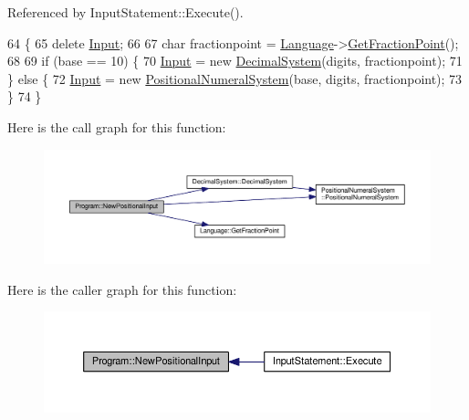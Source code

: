Referenced by Input\+Statement\+::\+Execute().


\begin{DoxyCode}
64 \{
65     \textcolor{keyword}{delete} \hyperlink{classProgram_a6327f15962926e4f74f15e8ff56e04e5}{Input};
66 
67     \textcolor{keywordtype}{char} fractionpoint = \hyperlink{classLanguage}{Language}->\hyperlink{classLanguage_a4c214f08d47e84d53f37bcb5b1fe1b65}{GetFractionPoint}();
68 
69     \textcolor{keywordflow}{if} (base == 10) \{
70         \hyperlink{classProgram_a6327f15962926e4f74f15e8ff56e04e5}{Input} = \textcolor{keyword}{new} \hyperlink{classDecimalSystem}{DecimalSystem}(digits, fractionpoint);
71     \} \textcolor{keywordflow}{else} \{
72         \hyperlink{classProgram_a6327f15962926e4f74f15e8ff56e04e5}{Input} = \textcolor{keyword}{new} \hyperlink{classPositionalNumeralSystem}{PositionalNumeralSystem}(base, digits, fractionpoint);
73     \}
74 \}
\end{DoxyCode}


Here is the call graph for this function\+:\nopagebreak
\begin{figure}[H]
\begin{center}
\leavevmode
\includegraphics[width=350pt]{classProgram_aef8e1c957776e550081cb2c47a11d64b_cgraph}
\end{center}
\end{figure}




Here is the caller graph for this function\+:\nopagebreak
\begin{figure}[H]
\begin{center}
\leavevmode
\includegraphics[width=350pt]{classProgram_aef8e1c957776e550081cb2c47a11d64b_icgraph}
\end{center}
\end{figure}


